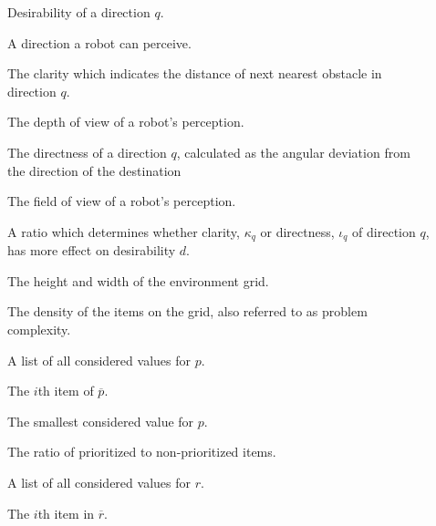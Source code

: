 \begin{description}
	\item[\parbox{\namewidth}{$d$}] Desirability of a direction $q$.
	\item[\parbox{\namewidth}{$q$}] A direction a robot can perceive.
	
	\item[\parbox{\namewidth}{$\kappa_q$}] The clarity which indicates the distance of next nearest obstacle in direction $q$.
	 
	\item[\parbox{\namewidth}{$\eta$}] The depth of view of a robot's perception.

	\item[\parbox{\namewidth}{$\iota_q$}] The directness of a direction $q$, calculated as the angular deviation from the direction of the destination

	\item[\parbox{\namewidth}{$f$}] The	field of view of a robot's perception.
		
	\item[\parbox{\namewidth}{$\lambda$}] A ratio which determines whether clarity, $\kappa_q$ or directness, $\iota_q$ of direction $q$, has more effect on desirability $d$.
	
	\item[\parbox{\namewidth}{$\Lambda$}] The height and width of the environment grid.

	\item[\parbox{\namewidth}{$p$}] The density of the items on the grid, also referred to as problem complexity.

	\item[\parbox{\namewidth}{$\overline{p}$}] A list of all considered values for $p$.

	\item[\parbox{\namewidth}{$p_i$}] The $i$th item of $\overline{p}$.

	\item[\parbox{\namewidth}{$p_{min}$}] The smallest considered value for $p$.
	
	
	\item[\parbox{\namewidth}{$r$}] The ratio of prioritized to non-prioritized items.

	\item[\parbox{\namewidth}{$\overline{r}$}] A list of all considered values for $r$.

	\item[\parbox{\namewidth}{$r_i$}] The $i$th item in $\overline{r}$.


\end{description}
